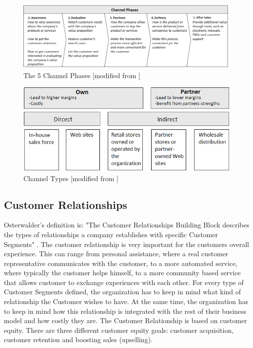 \begin{figure}[h]
\caption[ChannelPhases]{The 5 Channel Phases [modified from \cite{osterwalder} \cite{osterwalderthesis}]}
\label{fig:ChannelPhases}
\begin{center}
\includegraphics[scale=0.6]{kjopskjede}
\end{center}
\end{figure} 

\begin{figure}[h]
\caption[ChannelTypes]{Channel Types [modified from \cite{osterwalder}]}
\label{fig:ChannelTypes}
\begin{center}
\includegraphics[scale=0.8]{channeltypes}
\end{center}
\end{figure} 

\newpage
\subsection{Customer Relationships}
Osterwalder's definition is: "The Customer Relationships Building Block describes the types of relationships a company establishes with specific Customer Segments" \cite{osterwalder}. The customer relationship is very important for the customers overall experience. This can range from personal assistance, where a real customer representative communicates with the customer, to a more automated service, where typically the customer helps himself,  to a more community based service that allows customer to exchange experiences with each other. For every type of Customer Segments defined, the organization has to keep in mind what kind of relationship the Customer wishes to have. At the same time, the organization has to keep in mind how this relationship is integrated with the rest of their business model and how costly they are. The Customer Relationship is based on customer equity. There are three different customer equity goals: customer acquisition, customer retention and boosting sales (upselling).

